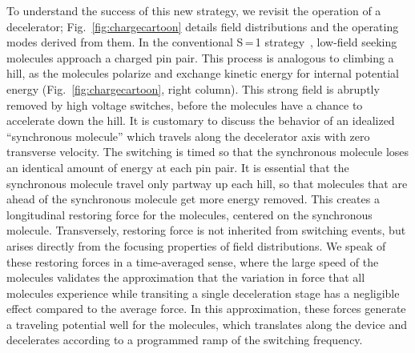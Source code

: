 \documentclass[%
 reprint,
 amsmath,amssymb,
 aps,
prl,
]{revtex4-1}
\begin{document}

To understand the success of this new strategy, we revisit the operation of a decelerator; Fig.~\ref{fig:chargecartoon} details field distributions and the operating modes derived from them.
In the conventional S\,=\,1 strategy~\cite{VanDeMeerakker2012}, low-field seeking molecules approach a charged pin pair. 
This process is analogous to climbing a hill, as the molecules polarize and exchange kinetic energy for internal potential energy (Fig.~\ref{fig:chargecartoon}, right column).
This strong field is abruptly removed by high voltage switches, before the molecules have a chance to accelerate down the hill.
It is customary to discuss the behavior of an idealized ``synchronous molecule'' which travels along the decelerator axis with zero transverse velocity.
The switching is timed so that the synchronous molecule loses an identical amount of energy at each pin pair.
It is essential that the synchronous molecule travel only partway up each hill, so that molecules that are ahead of the synchronous molecule get more energy removed.
This creates a longitudinal restoring force for the molecules, centered on the synchronous molecule.
Transversely, restoring force is not inherited from switching events, but arises directly from the focusing properties of field distributions.
We speak of these restoring forces in a time-averaged sense, where the large speed of the molecules validates the approximation that the variation in force that all molecules experience while transiting a single deceleration stage has a negligible effect compared to the average force.
In this approximation, these forces generate a traveling potential well for the molecules, which translates along the device and decelerates according to a programmed ramp of the switching frequency.
\end{document}
